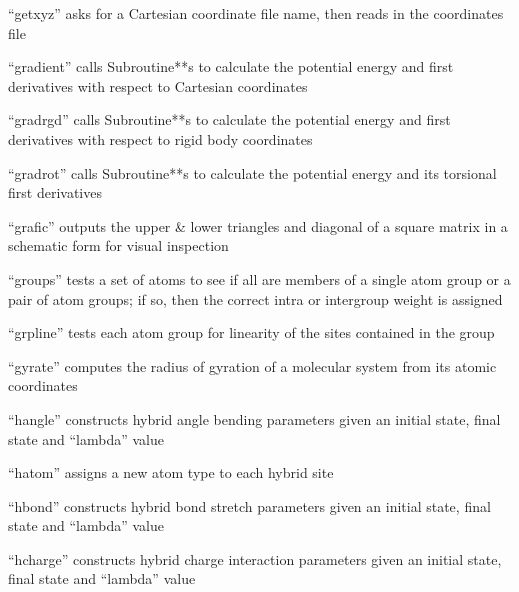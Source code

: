 \documentclass[letterpaper,11pt,english]{sphinxmanual}
\begin{document}

“getxyz” asks for a Cartesian coordinate file name, then reads in the coordinates file


“gradient” calls Subroutine**s to calculate the potential energy and first derivatives with respect to Cartesian coordinates


“gradrgd” calls Subroutine**s to calculate the potential energy and first derivatives with respect to rigid body coordinates


“gradrot” calls Subroutine**s to calculate the potential energy and its torsional first derivatives


“grafic” outputs the upper \& lower triangles and diagonal of a square matrix in a schematic form for visual inspection


“groups” tests a set of atoms to see if all are members of a single atom group or a pair of atom groups; if so, then the correct intra\sphinxhyphen{} or intergroup weight is assigned


“grpline” tests each atom group for linearity of the sites contained in the group


“gyrate” computes the radius of gyration of a molecular system from its atomic coordinates


“hangle” constructs hybrid angle bending parameters given an initial state, final state and “lambda” value


“hatom” assigns a new atom type to each hybrid site


“hbond” constructs hybrid bond stretch parameters given an initial state, final state and “lambda” value


“hcharge” constructs hybrid charge interaction parameters given an initial state, final state and “lambda” value
\end{document}
